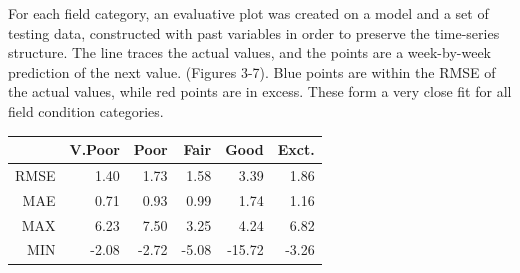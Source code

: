 \documentclass[a4paper]{apa6}
\begin{document}
For each field category, an evaluative plot was created on a model and a set of testing data, constructed with past variables in order to preserve the time-series structure.  The line traces the actual values, and the points are a week-by-week prediction of the next value. (Figures 3-7).  Blue points are within the RMSE of the actual values, while red points are in excess.  These form a very close fit for all field condition categories.

\begin{center}
\begin{tabular}{|r|r|r|r|r|r|}
  \hline
& V.Poor & Poor & Fair & Good & Exct. \\
\hline
RMSE & 1.40 & 1.73 & 1.58 & 3.39 & 1.86 \\
MAE & 0.71 & 0.93 & 0.99 & 1.74 & 1.16 \\
MAX & 6.23 & 7.50 & 3.25 & 4.24 & 6.82 \\
MIN & -2.08 & -2.72 & -5.08 & -15.72 & -3.26\\
  \hline
\end{tabular}
\end{center}
\end{document}
